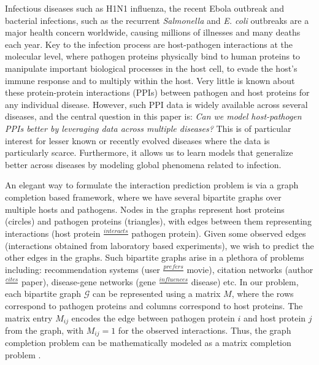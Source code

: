 \documentclass{bioinfo}
\begin{document}
Infectious diseases such as H1N1 influenza, the recent Ebola outbreak and bacterial infections, such as the recurrent \textit{Salmonella} and \textit{E. coli} outbreaks
are a major health concern worldwide, causing millions of illnesses and many deaths each year. 
Key to the infection process are host-pathogen interactions at the molecular level, where pathogen proteins physically bind to human proteins
to manipulate important biological processes in the host cell, to evade the host's immune response and to multiply within the host.
Very little is known about these protein-protein interactions (PPIs) between pathogen and host proteins for any individual disease.
However, such PPI data is widely available across several diseases, and the central question in this
paper is: \emph{Can we model host-pathogen PPIs better by leveraging
data across multiple diseases?} This is of particular interest for 
lesser known or recently evolved diseases where the data is particularly scarce. Furthermore, it
allows us to learn models that generalize better across diseases by
modeling global phenomena related to infection.

An elegant way to formulate the interaction prediction problem is via a graph completion based framework, where we have several bipartite 
graphs over multiple hosts and pathogens. %
Nodes in the graphs represent host proteins (circles) and pathogen proteins (triangles), with edges between them representing interactions 
(host protein $\frac{interacts}{}$ pathogen protein).
Given some observed edges (interactions obtained from laboratory based experiments), we wish to predict the other edges in the graphs.
Such bipartite graphs arise in a plethora of problems including: recommendation systems (user $\frac{prefers}{}$ movie), 
citation networks (author $\frac{cites}{}$ paper), disease-gene networks (gene $\frac{influences}{}$ disease) etc. 
In our problem, each bipartite graph $\mathcal{G}$ can be represented using a matrix $M$, where the rows correspond to pathogen proteins 
and columns correspond to host proteins.
The matrix entry $M_{ij}$ encodes the edge between pathogen protein $i$ and host protein $j$ from the graph, with $M_{ij}=1$ for the observed interactions. 
Thus, the graph completion problem can be mathematically modeled as a matrix completion problem \citep{candes08}. 
\end{document}
